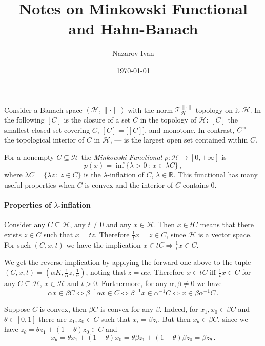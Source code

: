 \documentclass[a4paper]{article}
\title{Notes on Minkowski Functional and Hahn-Banach}
\author{Nazarov Ivan}
\date{\today}
\newcommand{\Hcal}{\mathcal{H}}
\newcommand{\real}{\mathbb{R}}
\newcommand{\interior}[1]{%
  {\kern0pt#1}^{\mathrm{o}}%
}
\newcommand{\Tcal}{\mathcal{T}}
\begin{document}
\maketitle

Consider a Banach space $(\Hcal, \|\cdot\|)$ with the norm $\Tcal^{\|\cdot\|}_\Hcal$
topology on it $\Hcal$. In the following $[C]$ is the closure of a set $C$ in the
topology of $\Hcal$: $[C]$ the smallest closed set covering $C$, $[C] = \bigl[[C]\bigr]$,
and monotone. In contrast, $\interior{C}$ --- the topological interior of $C$ in
$\Hcal$, --- is the largest open set contained within $C$.

For a nonempty $C \subseteq \Hcal$ the {\it Minkowski Functional} $p\colon \Hcal
\to [0, +\infty]$ is
\begin{equation*}
  p(x)
    = \inf \bigl\{ \lambda > 0\,:\, x \in \lambda C\bigr\}
    \,,
\end{equation*}
where $\lambda C = \{\lambda z \,:\, z\in C\}$ is the $\lambda$-inflation of $C$,
$\lambda \in\real$. This functional has many useful properties when $C$ is convex
and the interior of $C$ contains $0$.

\paragraph{Properties of $\lambda$-inflation} %
\label{par:properties_of_lambda_inflation}

Consider any $C\subseteq \Hcal$, any $t \neq 0$ and any $x\in \Hcal$. Then $x\in t C$
means that there exists $z \in C$ such that $x = t z$. Therefore $\tfrac1t x = z
\in C$, since $\Hcal$ is a vector space. For such $(C, x, t)$ we have the implication
$x \in t C \Rightarrow \tfrac1t x \in C$.

We get the reverse implication by applying the forward one above to the tuple $(C, x, t)
= (\alpha K, \tfrac1\alpha z, \tfrac1\alpha)$, noting that $z = \alpha x$. Therefore
$x\in t C$ iff $\tfrac1t x \in C$ for any $C\subseteq \Hcal$, $x\in \Hcal$ and $t > 0$.
Furthermore, for any $\alpha, \beta \neq 0$ we have
\begin{equation*}
  \alpha x \in \beta C \Leftrightarrow
  \beta^{-1} \alpha x \in C \Leftrightarrow
  \beta^{-1} x \in \alpha^{-1} C \Leftrightarrow
  x \in \beta \alpha^{-1} C
  \,.
\end{equation*}

Suppose $C$ is convex, then $\beta C$ is convex for any $\beta$. Indeed, for $x_1,
x_0 \in \beta C$ and $\theta\in [0, 1]$ there are $z_1, z_0 \in C$ such that $x_i
= \beta z_i$. But then $x_\theta \in \beta C$, since we have $z_\theta = \theta z_1
+ (1-\theta) z_0 \in C$ and
\begin{equation*}
  x_\theta
  = \theta x_1 + (1-\theta) x_0
  = \theta \beta z_1 + (1-\theta) \beta z_0
  = \beta z_\theta
  \,.
\end{equation*}
\end{document}
